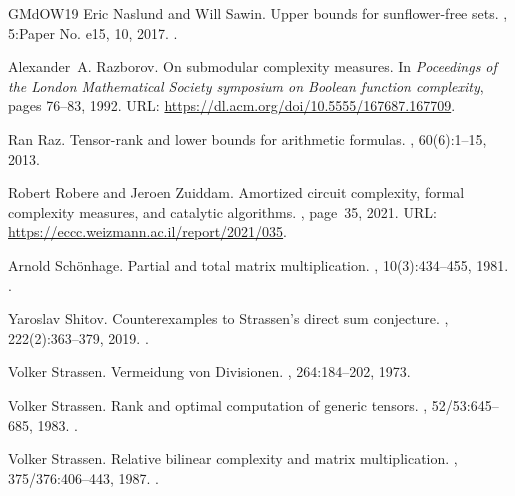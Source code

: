 \documentclass[10pt,a4paper]{article}
\theoremstyle{definition}
\theoremstyle{remark}
\begin{document}
\begin{thebibliography}{GMdOW19}
Eric Naslund and Will Sawin.
\newblock Upper bounds for sunflower-free sets.
, 5:Paper No. e15, 10, 2017.
\newblock \href {https://doi.org/10.1017/fms.2017.12}
  {}.

Alexander~A. Razborov.
\newblock On submodular complexity measures.
\newblock In {\em Poceedings of the London Mathematical Society symposium on
  Boolean function complexity}, pages 76--83, 1992.
\newblock URL: \url{https://dl.acm.org/doi/10.5555/167687.167709}.

Ran Raz.
\newblock Tensor-rank and lower bounds for arithmetic formulas.
, 60(6):1--15, 2013.

Robert Robere and Jeroen Zuiddam.
\newblock Amortized circuit complexity, formal complexity measures, and
  catalytic algorithms.
, page~35, 2021.
\newblock URL: \url{https://eccc.weizmann.ac.il/report/2021/035}.

Arnold Sch{\"o}nhage.
\newblock Partial and total matrix multiplication.
, 10(3):434--455, 1981.
\newblock \href {https://doi.org/10.1137/0210032} {}.

Yaroslav Shitov.
\newblock Counterexamples to {S}trassen's direct sum conjecture.
, 222(2):363--379, 2019.
\newblock \href {https://doi.org/10.4310/ACTA.2019.v222.n2.a3}
  {}.

Volker Strassen.
\newblock Vermeidung von {D}ivisionen.
, 264:184--202, 1973.

Volker Strassen.
\newblock Rank and optimal computation of generic tensors.
, 52/53:645--685, 1983.
\newblock \href {https://doi.org/10.1016/0024-3795(83)80041-X}
  {}.

Volker Strassen.
\newblock Relative bilinear complexity and matrix multiplication.
, 375/376:406--443, 1987.
\newblock \href {https://doi.org/10.1515/crll.1987.375-376.406}
  {}.


\end{thebibliography}
\end{document}
